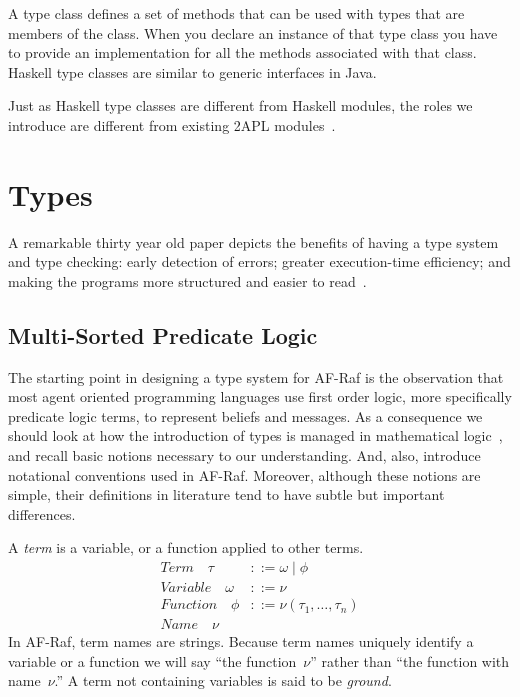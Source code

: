 \documentclass[a4paper,12pt,oneside,fleqn]{book} %
\newcommand{\todo}[1]{[\textcolor{red}{TODO}: #1]}
\begin{document}
A type class defines a set of methods that can be used with types that are
members of the class. When you declare an instance of that type class
you have to provide an implementation for all the methods associated with
that class. Haskell type classes are similar to generic interfaces in Java.

Just as Haskell type classes are different from Haskell modules, the roles
we introduce are different from existing 2APL
modules~\cite{dblp:conf/prima/dastanims08}.
\chapter{Types}\label{ch:types} %
A remarkable thirty year old paper depicts the benefits of having a type
system and type checking: early detection of errors; greater execution-time
efficiency; and making the programs more structured and easier to
read~\cite{DBLP:journals/csur/CardelliW85}.


\section{Multi-Sorted Predicate Logic} \label{sec:multi-sorted} %

The starting point in designing a type system for AF-Raf is the observation
that most agent oriented programming languages use first order logic, more
specifically predicate logic terms, to represent beliefs and messages. As a
consequence we should look at how the introduction of types is managed in
mathematical logic~\cite{DBLP:journals/jsyml/Wang52}, and recall basic
notions necessary to our understanding. And, also, introduce notational
conventions used in AF-Raf.  Moreover, although these notions are simple,
their definitions in literature tend to have subtle but important
differences.

A \emph{term} is a variable, or a function applied to other terms.
\begin{align}
\mathit{Term}\quad\tau &::= \omega \mid \phi \\
\mathit{Variable}\quad\omega &::= \nu \\
\mathit{Function}\quad\phi &::= \nu(\tau_1,\ldots,\tau_n) \\
\mathit{Name}\quad\nu
\end{align}
In AF-Raf, term names are strings.  Because term names uniquely identify a
variable or a function we will say ``the function~$\nu$'' rather than ``the
function with name~$\nu$.'' A term not containing variables is said to be
\emph{ground}.
\end{document}
